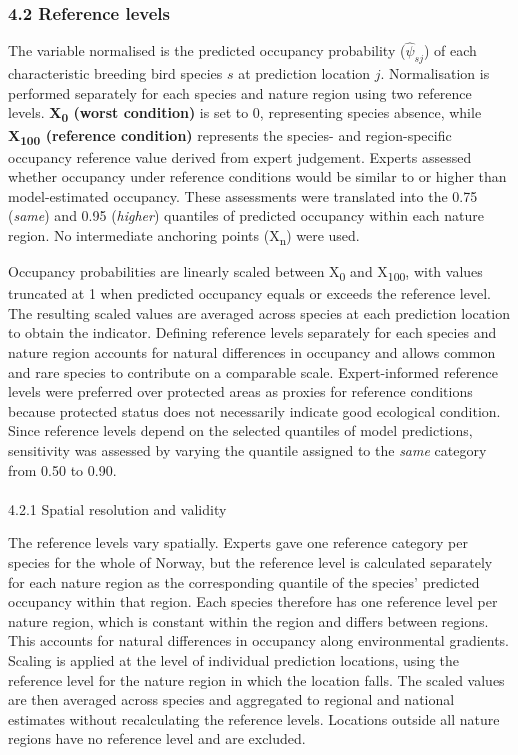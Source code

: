 \documentclass[
  letterpaper,
  DIV=11,
  numbers=noendperiod]{scrartcl}
\makeatletter
\let\oldparagraph\paragraph
\renewcommand{\paragraph}{
    \@ifstar
      \xxxParagraphStar
      \xxxParagraphNoStar
  }
\newcommand{\xxxParagraphStar}[1]{\oldparagraph*{#1}\mbox{}}
\newcommand{\xxxParagraphNoStar}[1]{\oldparagraph{#1}\mbox{}}
\makeatother
\begin{document}
\subsubsection{4.2 Reference levels}\label{reference-levels}

The variable normalised is the predicted occupancy probability
(\(\hat{\psi}_{sj}\)) of each characteristic breeding bird species \(s\)
at prediction location \(j\). Normalisation is performed separately for
each species and nature region using two reference levels.
\textbf{X\textsubscript{0} (worst condition)} is set to 0, representing
species absence, while \textbf{X\textsubscript{100} (reference
condition)} represents the species- and region-specific occupancy
reference value derived from expert judgement. Experts assessed whether
occupancy under reference conditions would be similar to or higher than
model-estimated occupancy. These assessments were translated into the
0.75 (\emph{same}) and 0.95 (\emph{higher}) quantiles of predicted
occupancy within each nature region. No intermediate anchoring points
(X\textsubscript{n}) were used.

Occupancy probabilities are linearly scaled between X\textsubscript{0}
and X\textsubscript{100}, with values truncated at 1 when predicted
occupancy equals or exceeds the reference level. The resulting scaled
values are averaged across species at each prediction location to obtain
the indicator. Defining reference levels separately for each species and
nature region accounts for natural differences in occupancy and allows
common and rare species to contribute on a comparable scale.
Expert-informed reference levels were preferred over protected areas as
proxies for reference conditions because protected status does not
necessarily indicate good ecological condition. Since reference levels
depend on the selected quantiles of model predictions, sensitivity was
assessed by varying the quantile assigned to the \emph{same} category
from 0.50 to 0.90.

\paragraph{4.2.1 Spatial resolution and
validity}\label{spatial-resolution-and-validity}

The reference levels vary spatially. Experts gave one reference category
per species for the whole of Norway, but the reference level is
calculated separately for each nature region as the corresponding
quantile of the species' predicted occupancy within that region. Each
species therefore has one reference level per nature region, which is
constant within the region and differs between regions. This accounts
for natural differences in occupancy along environmental gradients.
Scaling is applied at the level of individual prediction locations,
using the reference level for the nature region in which the location
falls. The scaled values are then averaged across species and aggregated
to regional and national estimates without recalculating the reference
levels. Locations outside all nature regions have no reference level and
are excluded.
\end{document}
